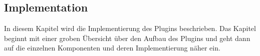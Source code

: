 \subsection{Implementation}

In diesem Kapitel wird die Implementierung des Plugins beschrieben.
Das Kapitel beginnt mit einer groben Übersicht über den Aufbau des Plugins und geht dann auf die einzelnen Komponenten und deren Implementierung näher ein.


\clearpage


